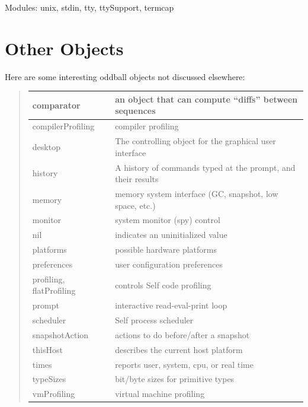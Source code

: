 \documentclass[letterpaper,10pt,english]{sphinxmanual}
\begin{document}
Modules: unix, stdin, tty, ttySupport, termcap


\section{Other Objects}
\label{oddball:other-objects}\label{oddball::doc}
Here are some interesting oddball objects not discussed elsewhere:
\begin{quote}

\begin{tabulary}{\linewidth}{|L|L|}
\hline

comparator
 & 
an object that can compute “diffs” between sequences
\\\hline

compilerProfiling
 & 
compiler profiling
\\\hline

desktop
 & 
The controlling object for the graphical user interface
\\\hline

history
 & 
A history of commands typed at the prompt, and their results
\\\hline

memory
 & 
memory system interface (GC, snapshot, low space, etc.)
\\\hline

monitor
 & 
system monitor (spy) control
\\\hline

nil
 & 
indicates an uninitialized value
\\\hline

platforms
 & 
possible hardware platforms
\\\hline

preferences
 & 
user configuration preferences
\\\hline

profiling, flatProfiling
 & 
controls Self code profiling
\\\hline

prompt
 & 
interactive read-eval-print loop
\\\hline

scheduler
 & 
Self process scheduler
\\\hline

snapshotAction
 & 
actions to do before/after a snapshot
\\\hline

thisHost
 & 
describes the current host platform
\\\hline

times
 & 
reports user, system, cpu, or real time
\\\hline

typeSizes
 & 
bit/byte sizes for primitive types
\\\hline

vmProfiling
 & 
virtual machine profiling
\\\hline
\end{tabulary}

\end{quote}
\end{document}
